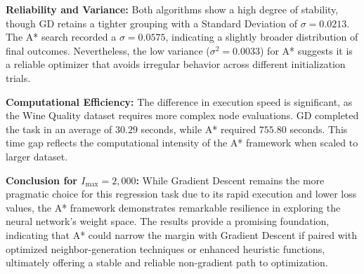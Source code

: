 \noindent \textbf{Reliability and Variance:} Both algorithms show a high degree of stability, though GD retains a tighter grouping with a Standard Deviation of $\sigma = 0.0213$. The A* search recorded a $\sigma = 0.0575$, indicating a slightly broader distribution of final outcomes. Nevertheless, the low variance ($\sigma^2 = 0.0033$) for A* suggests it is a reliable optimizer that avoids irregular behavior across different initialization trials.

\noindent \textbf{Computational Efficiency:} The difference in execution speed is significant, as the Wine Quality dataset requires more complex node evaluations. GD completed the task in an average of $30.29$ seconds, while A* required $755.80$ seconds. This time gap reflects the computational intensity of the A* framework when scaled to larger dataset.

\noindent \textbf{Conclusion for $I_{\text{max}}=2,000$:} While Gradient Descent remains the more pragmatic choice for this regression task due to its rapid execution and lower loss values, the A* framework demonstrates remarkable resilience in exploring the neural network's weight space. The results provide a promising foundation, indicating that A* could narrow the margin with Gradient Descent if paired with optimized neighbor-generation techniques or enhanced heuristic functions, ultimately offering a stable and reliable non-gradient path to optimization.